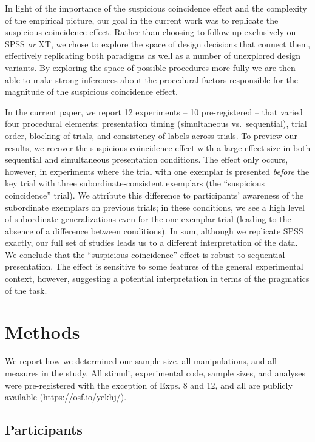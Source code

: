 \documentclass[english,floatsintext,man]{apa6}
\theoremstyle{definition}
\theoremstyle{definition}
\theoremstyle{definition}
\theoremstyle{remark}
\begin{document}
In light of the importance of the suspicious coincidence effect and the
complexity of the empirical picture, our goal in the current work was to
replicate the suspicious coincidence effect. Rather than choosing to
follow up exclusively on SPSS \emph{or} XT, we chose to explore the
space of design decisions that connect them, effectively replicating
both paradigms as well as a number of unexplored design variants. By
exploring the space of possible procedures more fully we are then able
to make strong inferences about the procedural factors responsible for
the magnitude of the suspicious coincidence effect.

In the current paper, we report 12 experiments -- 10 pre-registered --
that varied four procedural elements: presentation timing (simultaneous
vs.~sequential), trial order, blocking of trials, and consistency of
labels across trials. To preview our results, we recover the suspicious
coincidence effect with a large effect size in both sequential and
simultaneous presentation conditions. The effect only occurs, however,
in experiments where the trial with one exemplar is presented
\emph{before} the key trial with three subordinate-consistent exemplars
(the \enquote{suspicious coincidence} trial). We attribute this
difference to participants' awareness of the subordinate exemplars on
previous trials; in these conditions, we see a high level of subordinate
generalizations even for the one-exemplar trial (leading to the absence
of a difference between conditions). In sum, although we replicate SPSS
exactly, our full set of studies leads us to a different interpretation
of the data. We conclude that the \enquote{suspicious coincidence}
effect is robust to sequential presentation. The effect is sensitive to
some features of the general experimental context, however, suggesting a
potential interpretation in terms of the pragmatics of the task.

\section{Methods}\label{methods}

We report how we determined our sample size, all manipulations, and all
measures in the study. All stimuli, experimental code, sample sizes, and
analyses were pre-registered with the exception of Exps. 8 and 12, and
all are publicly available (\url{https://osf.io/yekhj/}).

\subsection{Participants}\label{participants}
\end{document}
